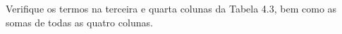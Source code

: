 Verifique os termos na terceira e quarta colunas da Tabela 4.3, bem como as somas de todas as quatro colunas.


